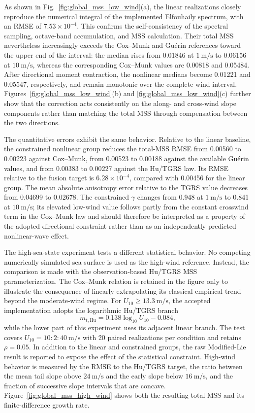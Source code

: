 As shown in Fig.~\ref{fig:global_mss_low_wind}(a), the linear realizations closely reproduce the numerical integral of the implemented Elfouhaily spectrum, with an RMSE of $7.53\times10^{-4}$. This confirms the self-consistency of the spectral sampling, octave-band accumulation, and MSS calculation. Their total MSS nevertheless increasingly exceeds the Cox--Munk and Gu\'erin references toward the upper end of the interval: the median rises from 0.01846 at $1~\mathrm{m/s}$ to 0.06156 at $10~\mathrm{m/s}$, whereas the corresponding Cox--Munk values are 0.00818 and 0.05484. After directional moment contraction, the nonlinear medians become 0.01221 and 0.05547, respectively, and remain monotonic over the complete wind interval. Figures~\ref{fig:global_mss_low_wind}(b) and \ref{fig:global_mss_low_wind}(c) further show that the correction acts consistently on the along- and cross-wind slope components rather than matching the total MSS through compensation between the two directions.

The quantitative errors exhibit the same behavior. Relative to the linear baseline, the constrained nonlinear group reduces the total-MSS RMSE from 0.00560 to 0.00223 against Cox--Munk, from 0.00523 to 0.00188 against the available Gu\'erin values, and from 0.00383 to 0.00227 against the Hu/TGRS law. Its RMSE relative to the fusion target is $6.28\times10^{-4}$, compared with 0.00456 for the linear group. The mean absolute anisotropy error relative to the TGRS value decreases from 0.04699 to 0.02678. The constrained $\gamma$ changes from 0.948 at $1~\mathrm{m/s}$ to 0.841 at $10~\mathrm{m/s}$; its elevated low-wind value follows partly from the constant crosswind term in the Cox--Munk law and should therefore be interpreted as a property of the adopted directional constraint rather than as an independently predicted nonlinear-wave effect.

The high-sea-state experiment tests a different statistical behavior.
No competing numerically simulated sea surface is used as the high-wind
reference. Instead, the comparison is made with the observation-based
Hu/TGRS MSS parameterization. The Cox--Munk relation is retained in the
figure only to illustrate the consequence of linearly extrapolating its
classical empirical trend beyond the moderate-wind regime. For $U_{10}\geq13.3~\mathrm{m/s}$, the accepted implementation adopts the logarithmic Hu/TGRS branch
\begin{equation}
m_{t,\mathrm{Hu}}
=
0.138\log_{10}U_{10}-0.084,
\label{eq:hu_high_wind_mss}
\end{equation}
while the lower part of this experiment uses its adjacent linear branch. The test covers $U_{10}=10:2:40~\mathrm{m/s}$ with 20 paired realizations per condition and retains $\rho=0.05$. In addition to the linear and constrained groups, the raw Modified-Lie result is reported to expose the effect of the statistical constraint. High-wind behavior is measured by the RMSE to the Hu/TGRS target, the ratio between the mean tail slope above $24~\mathrm{m/s}$ and the early slope below $16~\mathrm{m/s}$, and the fraction of successive slope intervals that are concave. Figure~\ref{fig:global_mss_high_wind} shows both the resulting total MSS and its finite-difference growth rate.

